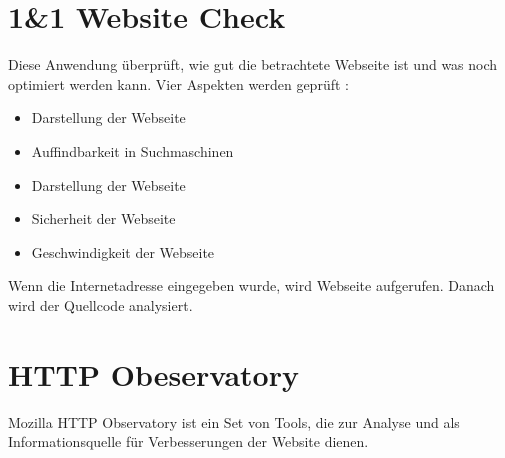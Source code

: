 \section{1\&1 Website Check}

Diese Anwendung überprüft, wie gut die betrachtete Webseite ist und was noch optimiert werden kann. Vier Aspekten werden geprüft \cite{1and12018}:
\begin{itemize}
	\item Darstellung der Webseite
	\item Auffindbarkeit in Suchmaschinen
	\item Darstellung der Webseite
	\item Sicherheit der Webseite
	\item Geschwindigkeit der Webseite
\end{itemize}

Wenn die Internetadresse eingegeben wurde, wird Webseite aufgerufen. Danach wird der Quellcode analysiert.

\section{HTTP Obeservatory}

Mozilla HTTP Observatory ist ein Set von Tools, die zur Analyse und als Informationsquelle für Verbesserungen der Website dienen.\cite{King2018} 

